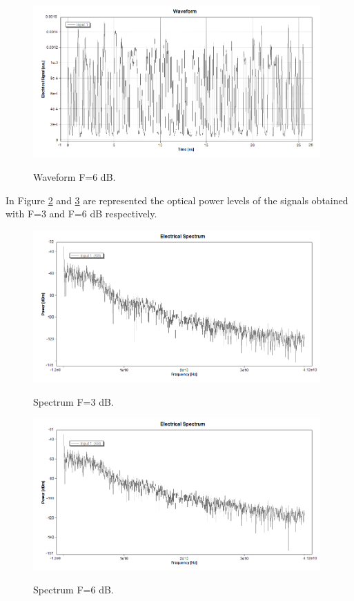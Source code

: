 \documentclass[a4paper,10pt]{report}
\begin{document}
 \begin{figure}[!ht]
   \centering
   \includegraphics[width=11cm]{3_wform.png}\\
   \caption{Waveform F=6 dB.}
   \label{3_wform}
 \end{figure}

 In Figure \ref{3_1spec} and \ref{3_2spec} are represented the optical power levels of the signals obtained with F=3 and F=6 dB respectively.
 
 \newpage
 \begin{figure}[!ht]
   \centering
   \includegraphics[width=11cm]{3_1pw.png}\\
   \caption{Spectrum F=3 dB.}
   \label{3_1spec}
 \end{figure}
 
  \begin{figure}[!ht]
   \centering
   \includegraphics[width=11cm]{3_2pw.png}\\
   \caption{Spectrum F=6 dB.}
   \label{3_2spec}
 \end{figure}
 
\end{document}
